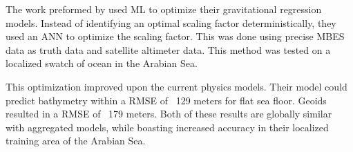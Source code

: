 \par
The work preformed by \cite{jena2012prediction} used \ac{ML} to optimize their gravitational regression models.
Instead of identifying an optimal scaling factor deterministically, they used an \ac{ANN} to optimize the scaling factor.
This was done using precise \ac{MBES} data as truth data and satellite altimeter data.
This method was tested on a localized swatch of ocean in the Arabian Sea.

\par
This optimization improved upon the current physics models.
Their model could predict bathymetry within a \ac{RMSE} of ~129 meters for flat sea floor.
Geoids resulted in a \ac{RMSE} of ~179 meters.
Both of these results are globally similar with aggregated models, while boasting increased accuracy in their localized training area of the Arabian Sea.

